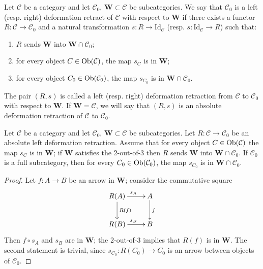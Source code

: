 \begin{defin} \label{def localizing subcategories}
Let $\mathcal C$ be a category and let $\mathcal C_0$, $\mathbf W \subset \mathcal C$ be subcategories. We say that $\mathcal C_0$ is a left (resp. right) deformation retract of $\mathcal C$ with respect to $\mathbf W$ if there exists a functor $R \colon \mathcal C \to \mathcal C_0$ and a natural transformation $s \colon R \to \mathrm{Id}_{\mathcal C}$ (resp. $s \colon \mathrm{Id}_{\mathcal C} \to R$) such that:
\begin{enumerate}
\item $R$ sends $\mathbf W$ into $\mathbf W \cap \mathcal C_0$;
\item for every object $C \in \mathrm{Ob}(\mathcal C)$, the map $s_C$ is in $\mathbf W$;
\item for every object $C_0 \in \mathrm{Ob}(\mathcal C_0)$, the map $s_{C_0}$ is in $\mathbf W \cap \mathcal C_0$.
\end{enumerate}
The pair $(R,s)$ is called a left (resp. right) deformation retraction from $\mathcal C$ to $\mathcal C_0$ with respect to $\mathbf W$. If $\mathbf W = \mathcal C$, we will say that $(R,s)$ is an absolute deformation retraction of $\mathcal C$ to $\mathcal C_0$.
\end{defin}

\begin{lemma} \label{lemma localizing subcategories}
Let $\mathcal C$ be a category and let $\mathcal C_0$, $\mathbf W \subset \mathcal C$ be subcategories. Let $R \colon \mathcal C \to \mathcal C_0$ be an absolute left deformation retraction. Assume that for every object $C \in \mathrm{Ob}(\mathcal C)$ the map $s_C$ is in $\mathbf W$; if $\mathbf W$ satisfies the 2-out-of-3 then $R$ sends $\mathbf W$ into $\mathbf W \cap \mathcal C_0$. If $\mathcal C_0$ is a full subcategory, then for every $C_0 \in \mathrm{Ob}(\mathcal C_0)$, the map $s_{C_0}$ is in $\mathbf W \cap \mathcal C_0$.
\end{lemma}

\begin{proof}
Let $f \colon A \to B$ be an arrow in $\mathbf W$; consider the commutative square
\[
\xymatrix{
R(A) \ar[d]^{R(f)} \ar[r]^{s_A} & A \ar[d]^f \\ R(B) \ar[r]^{s_B} & B
}
\]
Then $f \circ s_A$ and $s_B$ are in $\mathbf W$; the 2-out-of-3 implies that $R(f)$ is in $\mathbf W$. The second statement is trivial, since $s_{C_0} \colon R(C_0) \to C_0$ is an arrow between objects of $\mathcal C_0$.
\end{proof}

